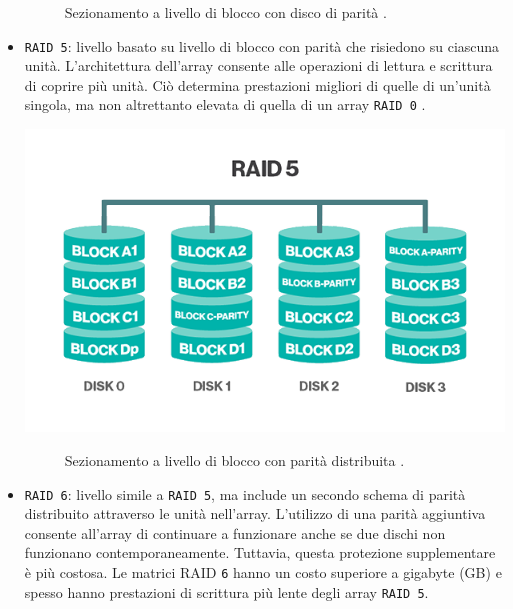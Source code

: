 \begin{itemize}
\begin{figure}[htbp]
\caption{Sezionamento a livello di blocco con disco di parit\`{a} \cite{etichetta9}.}
\label{fig:raid44} 
\end{figure}

\item
\verb"RAID 5": livello basato su livello di blocco con parit\`{a} che risiedono su ciascuna unit\`{a}. L'architettura dell'array consente alle operazioni di lettura e scrittura di coprire pi\`{u} unit\`{a}. Ci\`{o} determina prestazioni migliori di quelle di un'unit\`{a} singola, ma non altrettanto elevata di quella di un array \verb"RAID 0" \cite{etichetta9}.\\

\begin{center}
\includegraphics[scale=0.50]{img/raid55.png}
\end{center}

\begin{figure}[htbp]
\caption{Sezionamento a livello di blocco con parit\`{a} distribuita \cite{etichetta9}.}
\label{fig:raid55}
\end{figure}

\item
\verb"RAID 6": livello simile a \verb"RAID 5", ma include un secondo schema di parit\`{a} distribuito attraverso le unit\`{a} nell'array. L'utilizzo di una parit\`{a} aggiuntiva consente all'array di continuare a funzionare anche se due dischi non funzionano contemporaneamente. Tuttavia, questa protezione supplementare \`{e} pi\`{u} costosa. Le matrici RAID \verb"6" hanno un costo superiore a gigabyte (GB) e spesso hanno prestazioni di scrittura pi\`{u} lente degli array \verb"RAID 5"\cite{etichetta9}.\\


\end{itemize}
